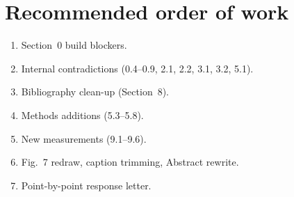 \documentclass[10pt,a4paper]{article}
\begin{document}
\section*{Recommended order of work}
\begin{enumerate}[leftmargin=1.8em]
\item Section~0 build blockers.
\item Internal contradictions (0.4--0.9, 2.1, 2.2, 3.1, 3.2, 5.1).
\item Bibliography clean-up (Section~8).
\item Methods additions (5.3--5.8).
\item New measurements (9.1--9.6).
\item Fig.~7 redraw, caption trimming, Abstract rewrite.
\item Point-by-point response letter.
\end{enumerate}
\end{document}
